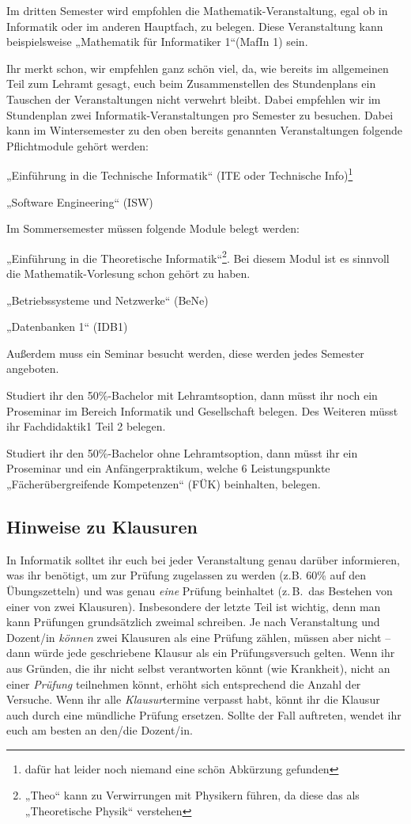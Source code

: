 Im dritten Semester wird empfohlen die Mathematik-Veranstaltung, egal ob in Informatik oder im anderen Hauptfach, zu belegen. Diese Veranstaltung kann beispielsweise „Mathematik für Informatiker 1“(MafIn 1) sein.

Ihr merkt schon, wir empfehlen ganz schön viel, da, wie bereits im allgemeinen Teil zum Lehramt gesagt, euch beim Zusammenstellen des Stundenplans ein Tauschen der Veranstaltungen nicht verwehrt bleibt. Dabei empfehlen wir im Stundenplan zwei Informatik-Veranstaltungen pro Semester zu besuchen. Dabei kann im Wintersemester zu den oben bereits genannten Veranstaltungen folgende Pflichtmodule gehört werden: 

 „Einführung in die Technische Informatik“ (ITE oder Technische Info)\footnote{dafür hat leider noch niemand eine schön Abkürzung gefunden}
 
„Software Engineering“ (ISW)

Im Sommersemester müssen folgende Module belegt werden:

„Einführung in die Theoretische Informatik“\footnote{„Theo“ kann zu Verwirrungen mit Physikern führen, da diese das als „Theoretische Physik“ verstehen}. Bei diesem Modul ist es sinnvoll die Mathematik-Vorlesung schon gehört zu haben.
 
 
„Betriebssysteme und Netzwerke“ (BeNe)

„Datenbanken 1“ (IDB1)

Außerdem muss ein Seminar besucht werden, diese werden jedes Semester angeboten. 

Studiert ihr den 50\%-Bachelor mit Lehramtsoption, dann müsst ihr noch ein Proseminar im Bereich Informatik und Gesellschaft belegen. Des Weiteren müsst ihr Fachdidaktik1 Teil 2 belegen. 

Studiert ihr den 50\%-Bachelor ohne Lehramtsoption, dann müsst ihr ein Proseminar und ein Anfängerpraktikum, welche 6 Leistungspunkte „Fächerübergreifende Kompetenzen“ (FÜK) beinhalten, belegen. 

\subsection{Hinweise zu Klausuren}
In Informatik solltet ihr euch bei jeder Veranstaltung genau darüber informieren, was ihr benötigt, um zur Prüfung zugelassen zu werden (z.B. 60\% auf den Übungszetteln) und was genau \emph{eine} Prüfung beinhaltet (z.\,B.\ das Bestehen von einer von zwei Klausuren). Insbesondere der letzte Teil ist wichtig, denn man kann Prüfungen grundsätzlich zweimal schreiben. Je nach Veranstaltung und Dozent/in \emph{können} zwei Klausuren als eine Prüfung zählen, müssen aber nicht -- dann würde jede geschriebene Klausur als ein Prüfungsversuch gelten. Wenn ihr aus Gründen, die ihr nicht selbst verantworten könnt (wie Krankheit), nicht an einer \emph{Prüfung} teilnehmen könnt, erhöht sich entsprechend die Anzahl der Versuche. Wenn ihr alle \emph{Klausur}termine verpasst habt, könnt ihr die Klausur auch durch eine mündliche Prüfung ersetzen. Sollte der Fall auftreten, wendet ihr euch am besten an den/die Dozent/in. 

